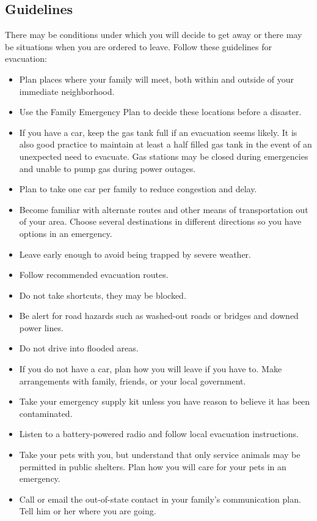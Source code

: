 \documentclass{scrreprt}
\begin{document}
\subsection{Guidelines}
There may be conditions under which you will decide to get away or there may be situations when you are ordered to leave. Follow these guidelines for evacuation:

\begin{itemize}
    \item Plan places where your family will meet, both within and outside of your immediate neighborhood.
    \item Use the Family Emergency Plan to decide these locations before a disaster.
\item If you have a car, keep the gas tank full if an evacuation seems likely. It is also good practice to maintain at least a half filled gas tank in the event of an unexpected need to evacuate. Gas stations may be closed during emergencies and unable to pump gas during power outages.
\item Plan to take one car per family to reduce congestion and delay.
\item Become familiar with alternate routes and other means of transportation out of your area. Choose several destinations in different directions so you have options in an emergency.
\item Leave early enough to avoid being trapped by severe weather.
\item Follow recommended evacuation routes.
\item Do not take shortcuts, they may be blocked.
\item Be alert for road hazards such as washed-out roads or bridges and downed power lines.
\item Do not drive into flooded areas.
\item If you do not have a car, plan how you will leave if you have to. Make arrangements with family, friends, or your local government.
\item Take your emergency supply kit unless you have reason to believe it has been contaminated.
\item Listen to a battery-powered radio and follow local evacuation instructions.
\item Take your pets with you, but understand that only service animals may be permitted in public shelters. Plan how you will care for your pets in an emergency.
\item Call or email the out-of-state contact in your family's communication plan. Tell him or her where you are going.

\end{itemize}
\end{document}

